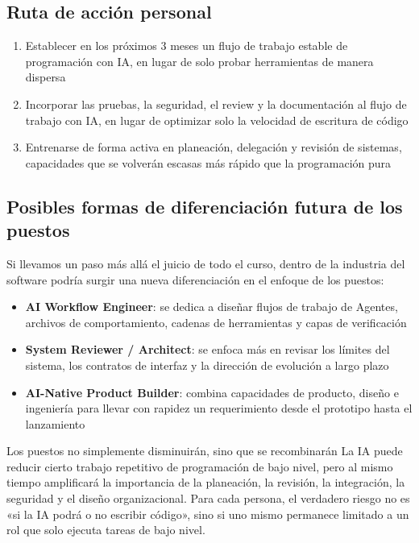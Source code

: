 \documentclass[a4paper]{article}
\begin{document}
\subsection{Ruta de acción personal}

\begin{enumerate}
    \item Establecer en los próximos 3 meses un flujo de trabajo estable de programación con IA, en lugar de solo probar herramientas de manera dispersa
    \item Incorporar las pruebas, la seguridad, el review y la documentación al flujo de trabajo con IA, en lugar de optimizar solo la velocidad de escritura de código
    \item Entrenarse de forma activa en planeación, delegación y revisión de sistemas, capacidades que se volverán escasas más rápido que la programación pura
\end{enumerate}

\subsection{Posibles formas de diferenciación futura de los puestos}

Si llevamos un paso más allá el juicio de todo el curso, dentro de la industria del software podría surgir una nueva diferenciación en el enfoque de los puestos:

\begin{itemize}
    \item \textbf{AI Workflow Engineer}: se dedica a diseñar flujos de trabajo de Agentes, archivos de comportamiento, cadenas de herramientas y capas de verificación
    \item \textbf{System Reviewer / Architect}: se enfoca más en revisar los límites del sistema, los contratos de interfaz y la dirección de evolución a largo plazo
    \item \textbf{AI-Native Product Builder}: combina capacidades de producto, diseño e ingeniería para llevar con rapidez un requerimiento desde el prototipo hasta el lanzamiento
\end{itemize}

\begin{warningbox}{Los puestos no simplemente disminuirán, sino que se recombinarán}
La IA puede reducir cierto trabajo repetitivo de programación de bajo nivel, pero al mismo tiempo amplificará la importancia de la planeación, la revisión, la integración, la seguridad y el diseño organizacional. Para cada persona, el verdadero riesgo no es «si la IA podrá o no escribir código», sino si uno mismo permanece limitado a un rol que solo ejecuta tareas de bajo nivel.
\end{warningbox}
\end{document}
